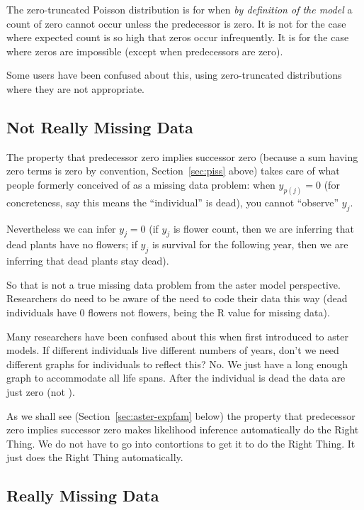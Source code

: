 The zero-truncated Poisson distribution is for when \emph{by definition
of the model} a count of zero cannot occur unless the predecessor is zero.
It is not for the case where expected count is so high
that zeros occur infrequently.
It is for the case where zeros are impossible (except when predecessors
are zero).

Some users have been confused about this, using zero-truncated distributions
where they are not appropriate.

\subsection{Not Really Missing Data}
\label{sec:miss}

The property that predecessor zero implies successor zero
(because a sum having zero terms is zero by convention,
Section~\ref{sec:piss} above)
takes care of what people formerly conceived of as a missing data problem:
when $y_{p(j)} = 0$ (for concreteness, say this means the ``individual''
is dead), you cannot ``observe'' $y_j$.

Nevertheless we can infer $y_j = 0$
(if $y_j$ is flower count, then we are inferring that dead plants have
no flowers; if $y_j$ is survival for the following year, then we are
inferring that dead plants stay dead).

So that is not a true missing data problem from the aster model perspective.
Researchers do need to be aware of the need to code their data this way
(dead individuals have 0 flowers not  flowers,  being
the R value for missing data).

Many researchers have been confused about this when first introduced to
aster models.  If different individuals live different numbers of years,
don't we need different graphs for individuals to reflect this?  No.
We just have a long enough graph to accommodate all life spans.  After
the individual is dead the data are just zero (not ).

As we shall see (Section~\ref{sec:aster-expfam} below)
the property that predecessor zero implies successor zero
makes likelihood inference automatically do the Right Thing.
We do not have to go into contortions to get it to do the Right Thing.
It just does the Right Thing automatically.

\subsection{Really Missing Data}
\label{sec:miss-too}

